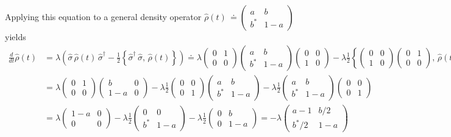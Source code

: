 \documentclass[11pt]{article}
\numberwithin{equation}{section} %
\numberwithin{figure}{section} %
\begin{document}
\begin{appendices}
Applying this equation to a general density operator $\hat{\rho}(t)\,\doteq\begin{pmatrix}a&b\\b^*&1-a\end{pmatrix}$ yields
\begin{equation}
\begin{split}
\frac{d}{dt}\hat{\rho}(t)
&=\lambda\left(\hat{\sigma}\,\hat{\rho}(t)\,\hat{\sigma}^\dagger -\frac{1}{2}\left\lbrace\hat{\sigma}^\dagger\,\hat{\sigma},\,\hat{\rho}(t)\right\rbrace\right)\doteq\lambda\begin{pmatrix}0&1\\0&0\end{pmatrix}\begin{pmatrix}a&b\\b^*&1-a\end{pmatrix}\begin{pmatrix}0&0\\1&0\end{pmatrix}-\lambda\frac{1}{2}\left\lbrace\begin{pmatrix}0&0\\1&0\end{pmatrix}\begin{pmatrix}0&1\\0&0\end{pmatrix},\,\hat{\rho}(t)\right\rbrace\\
&=\lambda\begin{pmatrix}0&1\\0&0\end{pmatrix}\begin{pmatrix}b&0\\1-a&0\end{pmatrix}-\lambda\frac{1}{2}\begin{pmatrix}0&0\\0&1\end{pmatrix}\begin{pmatrix}a&b\\b^*&1-a\end{pmatrix}-\lambda\frac{1}{2}\begin{pmatrix}a&b\\b^*&1-a\end{pmatrix}\begin{pmatrix}0&0\\0&1\end{pmatrix}\\
&=\lambda\begin{pmatrix}1-a&0\\0&0\end{pmatrix}-\lambda\frac{1}{2}\begin{pmatrix}0&0\\b^*&1-a\end{pmatrix}-\lambda\frac{1}{2}\begin{pmatrix}0&b\\0&1-a\end{pmatrix}=-\lambda\begin{pmatrix}a-1&b/2\\b^*/2&1-a\end{pmatrix}

\end{split}
\end{equation}
\end{appendices}
\end{document}
